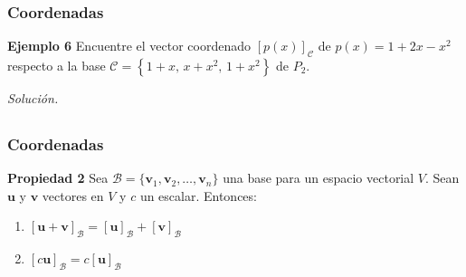 \begin{frame}\frametitle{Coordenadas}

%	

\vspace{0mm}

\begin{ej}{\textbf{Ejemplo 6}}\justifying
	Encuentre el vector coordenado $\left[ p(x) \right]_{\mathcal{C}}$ de $p(x)=1+2x-x^2$ respecto a
	la base $\mathcal{C} = \left\{1+x,\, x+x^2,\, 1+x^2 \right\}$ de $P_2$.
\end{ej}
\textit{Solución.}

\end{frame}


\subsection{}

\begin{frame}\frametitle{Coordenadas}

\begin{prop}{\textbf{Propiedad 2}}
	Sea $\mathcal{B}=\{\mathbf{v}_1, \mathbf{v}_2, \hdots , \mathbf{v}_n \}$ una base para un espacio vectorial $V$. 
	Sean $\mathbf{u}$ y $\mathbf{v}$ vectores en $V$ y $c$ un escalar. Entonces:
	\begin{enumerate}
		\item[\labelname{$a$}] $\left[ \mathbf{u} +\mathbf{v} \right]_{\mathcal{B}} = \left[ \mathbf{u} \right]_{\mathcal{B}} + \left[ \mathbf{v} \right]_{\mathcal{B}}$
		\item[\labelname{$a$}] $\left[ c \mathbf{u} \right]_{\mathcal{B}} = c\left[ \mathbf{u} \right]_{\mathcal{B}}$
	\end{enumerate}
\end{prop}	

\end{frame}

